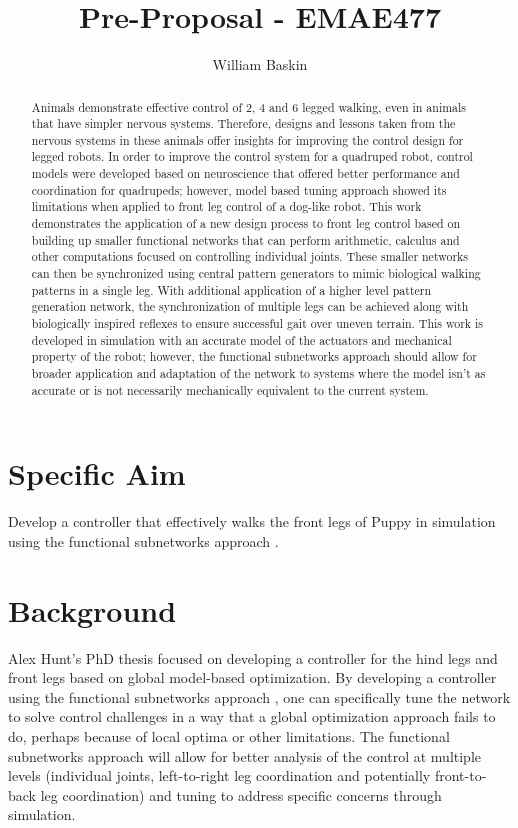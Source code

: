 \documentclass[12pt, letterpaper, oneside, notitlepage, onecolumn]{article}
\author{William Baskin}
\title{Pre-Proposal - EMAE477}
\begin{document}
\maketitle

\begin{abstract}
Animals demonstrate effective control of 2, 4 and 6 legged walking, even in animals that have simpler nervous systems.
Therefore, designs and lessons taken from the nervous systems in these animals offer insights for improving the control design for legged robots.
In order to improve the control system for a quadruped robot, control models were developed based on neuroscience that offered better performance and coordination for quadrupeds; however, model based tuning approach showed its limitations when applied to front leg control of a dog-like robot.
This work demonstrates the application of a new design process to front leg control based on building up smaller functional networks that can perform arithmetic, calculus and other computations focused on controlling individual joints.
These smaller networks can then be synchronized using central pattern generators to mimic biological walking patterns in a single leg.
With additional application of a higher level pattern generation network, the synchronization of multiple legs can be achieved along with biologically inspired reflexes to ensure successful gait over uneven terrain.
This work is developed in simulation with an accurate model of the actuators and mechanical property of the robot; however, the functional subnetworks approach should allow for broader application and adaptation of the network to systems where the model isn't as accurate or is not necessarily mechanically equivalent to the current system.
\end{abstract}

\newpage

\section*{Specific Aim}

Develop a controller that effectively walks the front legs of Puppy in simulation using the functional subnetworks approach \cite{Szczecinski2017}.

\section{Background}

Alex Hunt's PhD thesis \cite{HuntThesis} focused on developing a controller for the hind legs and front legs based on global model-based optimization. By developing a controller using the functional subnetworks approach \cite{Szczecinski2017}, one can specifically tune the network to solve control challenges in a way that a global optimization approach fails to do, perhaps because of local optima or other limitations. The functional subnetworks approach will allow for better analysis of the control at multiple levels (individual joints, left-to-right leg coordination and potentially front-to-back leg coordination) and tuning to address specific concerns through simulation.
\end{document}
